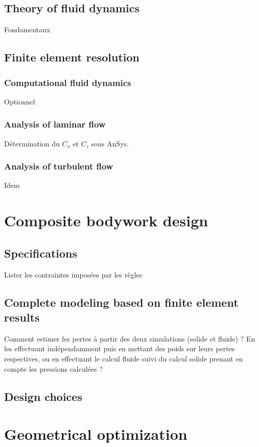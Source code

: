 \documentclass{article}
\begin{document}
\subsection{Theory of fluid dynamics}

Fondamentaux

\subsection{Finite element resolution}

\subsubsection{Computational fluid dynamics}

Optionnel

\subsubsection{Analysis of laminar flow}

Détermination du $C_x$ et $C_z$ sous AnSys.

\subsubsection{Analysis of turbulent flow}

Idem

\section{Composite bodywork design}

\subsection{Specifications}

Lister les contraintes imposées par les règles

\subsection{Complete modeling based on finite element results}

Comment estimer les pertes à partir des deux simulations (solide et fluide) ? En les effectuant indépendamment puis en mettant des poids sur leurs pertes respectives, ou en effectuant le calcul fluide suivi du calcul solide prenant en compte les pressions calculées ? 

\subsection{Design choices}

\section{Geometrical optimization}
\end{document}
